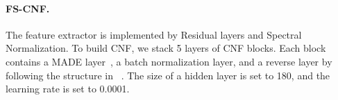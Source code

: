 \documentclass{article}
\newcommand{\agentIndex}{k}
\begin{document}
\paragraph{FS-CNF.} The feature extractor is implemented by Residual layers and Spectral Normalization. To build CNF, we stack 5 layers of CNF blocks. Each block contains a MADE layer~\cite{Germain2015made}, a batch normalization layer, and a reverse layer by following the structure in ~\cite{Papamakarios2017MAF}. The size of a hidden layer is set to 180, and the learning rate is set to 0.0001.
        
        
\end{document}
